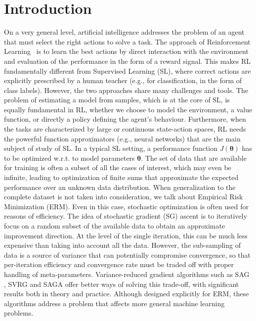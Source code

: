 \documentclass{article}
\makeatletter
\theoremstyle{remark}
\theoremstyle{definition}
\DeclareRobustCommand{\eg}{e.g.,\@\xspace}
\DeclareRobustCommand{\wrt}{w.r.t.\@\xspace}
\newcommand{\vtheta}{\boldsymbol{\theta}}
\makeatother
\begin{document}
\section{Introduction}
\vspace{-0.05in}
On a very general level, artificial intelligence addresses the problem of an agent that must select the right actions to solve a task. The approach of Reinforcement Learning~\citep{sutton1998reinforcement} is to learn the best actions by direct interaction with the environment and evaluation of the performance in the form of a reward signal. This makes RL fundamentally different from Supervised Learning (SL), where correct actions are explicitly prescribed by a human teacher (\eg for classification, in the form of class labels). However, the two approaches share many challenges and tools. The problem of estimating a model from samples, which is at the core of SL, is equally fundamental in RL, whether we choose to model the environment, a value function, or directly a policy defining the agent's behaviour. Furthermore, when the tasks are characterized by large or continuous state-action spaces, RL needs the powerful function approximators (\eg neural networks) that are the main subject of study of SL.
In a typical SL setting, a performance function $J(\vtheta)$ has to be optimized \wrt to model parameters $\vtheta$. The set of data that are available for training is often a subset of all the cases of interest, which may even be infinite, leading to optimization of finite sums that approximate the expected performance over an unknown data distribution. When generalization to the complete dataset is not taken into consideration, we talk about Empirical Risk Minimization (ERM). Even in this case, stochastic optimization is often used for reasons of efficiency. The idea of stochastic gradient (SG) ascent \cite{nesterov2013introductory} is to iteratively focus on a random subset of the available data to obtain an approximate improvement direction. At the level of the single iteration, this can be much less expensive than taking into account all the data. However, the sub-sampling of data is a source of variance that can potentially compromise convergence, so that per-iteration efficiency and convergence rate must be traded off with proper handling of meta-parameters.
Variance-reduced gradient algorithms such as SAG \cite{roux2012stochastic}, SVRG \cite{johnson2013accelerating} and SAGA \cite{defazio2014saga} offer better ways of solving this trade-off, with significant results both in theory and practice. Although designed explicitly for ERM, these algorithms address a problem that affects more general machine learning problems. 
\end{document}
